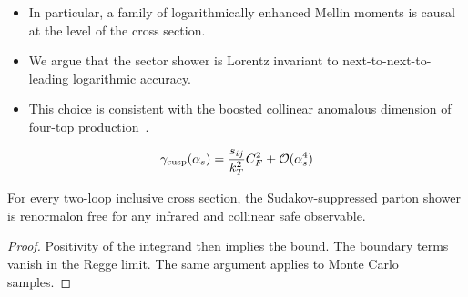 \begin{itemize}
  \item In particular, a family of logarithmically enhanced Mellin moments is causal at the level of the cross section.
  \item We argue that the sector shower is Lorentz invariant to next-to-next-to-leading logarithmic accuracy.
  \item This choice is consistent with the boosted collinear anomalous dimension of four-top production~\cite{TPC:0239-A-Four-Loop-Calculation-of-the-Anomalous-Dimension-Matrix-September-22-2026}.
\end{itemize}

\begin{equation}
  \gamma_{\rm cusp}(\alpha_s) = \frac{s_{ij}}{k_T^2} C_F^2 + \mathcal{O}(\alpha_s^{4})
  \label{eq:1}
\end{equation}

\begin{theorem}\label{thm:2}
For every two-loop inclusive cross section, the Sudakov-suppressed
parton shower is renormalon free for any infrared and collinear safe
observable.
\end{theorem}

\begin{proof}
Positivity of the integrand then implies the bound. The boundary terms
vanish in the Regge limit. The same argument applies to Monte Carlo
samples.
\end{proof}

